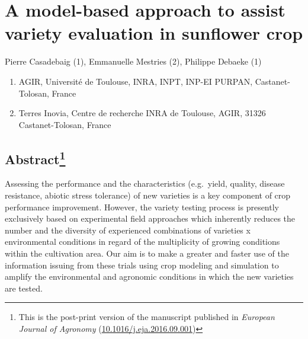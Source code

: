 \documentclass[a4paper]{article}
\title{}
\author{}
\date{}
\providecommand{\tightlist}{%
  \setlength{\itemsep}{0pt}\setlength{\parskip}{0pt}}
\let\rmarkdownfootnote\footnote%
\def\footnote{\protect\rmarkdownfootnote}
\begin{document}
\section{A model-based approach to assist variety evaluation in
sunflower
crop}\label{a-model-based-approach-to-assist-variety-evaluation-in-sunflower-crop}

Pierre Casadebaig (1), Emmanuelle Mestries (2), Philippe Debaeke (1)

\begin{enumerate}
\def\labelenumi{(\arabic{enumi})}
\tightlist
\item
  AGIR, Université de Toulouse, INRA, INPT, INP-EI PURPAN,
  Castanet-Tolosan, France
\item
  Terres Inovia, Centre de recherche INRA de Toulouse, AGIR, 31326
  Castanet-Tolosan, France
\end{enumerate}

\subsection[Abstract]{\texorpdfstring{Abstract\footnote{This is the
  post-print version of the manuscript published in \emph{European
  Journal of Agronomy}
  (\href{http://dx.doi.org/10.1016/j.eja.2016.09.001}{10.1016/j.eja.2016.09.001})}}{Abstract}}\label{abstract}

Assessing the performance and the characteristics (e.g.~yield, quality,
disease resistance, abiotic stress tolerance) of new varieties is a key
component of crop performance improvement. However, the variety testing
process is presently exclusively based on experimental field approaches
which inherently reduces the number and the diversity of experienced
combinations of varieties x environmental conditions in regard of the
multiplicity of growing conditions within the cultivation area. Our aim
is to make a greater and faster use of the information issuing from
these trials using crop modeling and simulation to amplify the
environmental and agronomic conditions in which the new varieties are
tested.
\end{document}
